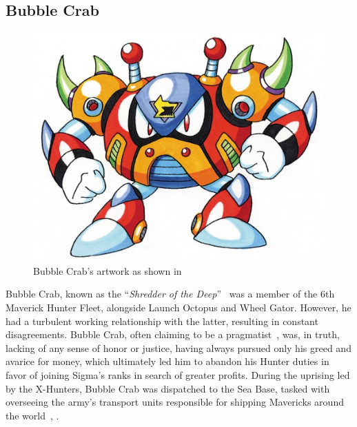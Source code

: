\subsection{Bubble Crab}\label{boss:Bubble_crab}
\begin{figure}[htp]
	\centering
	\includegraphics[height=\portraitsize]{figures/X2/Bubble_crab/Bubble_Crab.png}
	\caption{Bubble Crab's artwork as shown in \cite{book:MMX_Complete_art}}
\end{figure}
Bubble Crab, known as the ``\textit{Shredder of the Deep}''~\cite{book:MMX_Complete_art} was a member of the 6th Maverick Hunter Fleet, alongside Launch Octopus and Wheel Gator. However, he had a turbulent working relationship with the latter, resulting in constant disagreements. Bubble Crab, often claiming to be a pragmatist~\cite{Xcoll1:Manual_X2}, was, in truth, lacking of any sense of honor or justice, having always pursued only his greed and avarice for money, which ultimately led him to abandon his Hunter duties in favor of joining Sigma's ranks in search of greater profits. During the uprising led by the X-Hunters, Bubble Crab was dispatched to the Sea Base, tasked with overseeing the army's transport units responsible for shipping Mavericks around the world~\cite{wiki:Bubble_Crab}, \cite{wayback:X2_resources}.

